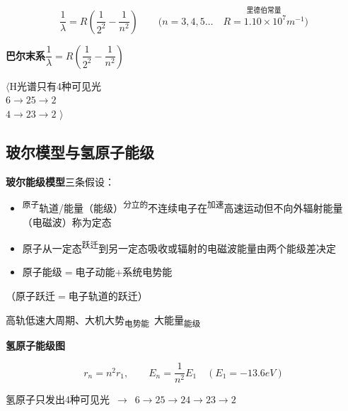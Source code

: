 \[
\frac{1}{\lambda}=R\left(\frac{1}{2^2}-\frac{1}{n^2}\right)\qquad\bigl(n=3,4,5\ldots\quad \overset{\text{里德伯常量}}{R=1.10\times10^{7}\unit{m^{-1}}}\bigr)
\] %

\textbf{巴尔末系}\quad $\dfrac{1}{\lambda}=R\left(\dfrac{1}{2^2}-\dfrac{1}{n^2}\right)$

\noindent $\langle$H光谱只有4种可见光\\
\hspace*{1.5em}$6\to2$\quad $5\to2$\\
\hspace*{1.5em}$4\to2$\quad $3\to2$ $\rangle$ %

\subsection{玻尔模型与氢原子能级}
\textbf{玻尔能级模型}\quad 三条假设：
\begin{itemize}
\item[①] \textsuperscript{原子}轨道/能量（能级）\textsuperscript{分立的}不连续\quad 电子在\textsuperscript{加速}高速运动但不向外辐射能量（电磁波）\quad 称为定态 %
\item[②] 原子从一定态\textsuperscript{跃迁}到另一定态\quad 吸收或辐射的电磁波能量\quad 由两个能级差决定
\item[③] 原子能级$=$电子动能$+$系统电势能
\end{itemize}

（原子跃迁$=$电子轨道的跃迁） %

高轨低速大周期、大机大势\textsubscript{电势能}\ 大能量\textsubscript{能级}

\textbf{氢原子能级图}

\[
r_n=n^2r_1,\qquad E_n=\frac{1}{n^2}E_1\quad(E_1=-13.6\unit{eV})
\]


氢原子只发出4种可见光\ $\to$\ $6\to2$\quad $5\to2$\quad $4\to2$\quad $3\to2$ %


